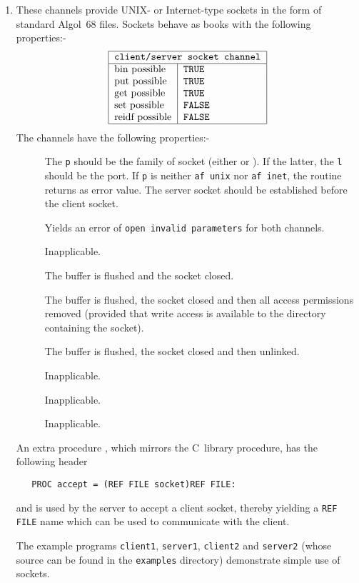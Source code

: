\begin{enumerate}
\item {}\newline
{}\newline
These channels provide UNIX- or Internet-type sockets in the form
of standard Algol~68 files.
Sockets behave as books with the following properties:-
$$\begin{tabular}{|l|l|}\hline
  \multicolumn{2}{|c|}{\texttt{client/server socket channel}}\\ \hline
  bin possible & \texttt{TRUE}\\
  put possible & \texttt{TRUE}\\
  get possible & \texttt{TRUE}\\
  set possible & \texttt{FALSE}\\
  reidf possible & \texttt{FALSE}\\ \hline
  \end{tabular}
$$
The channels have the following properties:-
\begin{description}
\item[] The \verb|p| should be the family of socket (either
 or ). If the latter, the \verb|l| should
be the port. If \verb|p| is neither \verb|af unix| nor \verb|af inet|,
the routine returns  as error value. The
server socket should be established before the client socket.
\item[] Yields an error of \verb|open invalid parameters| for
both channels.
\item[] Inapplicable.
\item[] The buffer is flushed and the socket closed.
\item[]  The buffer is flushed, the socket closed and then all
access permissions removed (provided that write access is available to
the directory containing the socket).
\item[] The buffer is flushed, the socket closed and then
unlinked.
\item[] Inapplicable.
\item[] Inapplicable.
\item[] Inapplicable.
\end{description}
An extra procedure , which mirrors the C~library procedure,
has the following header
\begin{verbatim}
   PROC accept = (REF FILE socket)REF FILE:
\end{verbatim}
\noindent
and is used by the server to accept a client socket, thereby yielding a
\verb|REF FILE| name which can be used to communicate with the client.

The example programs \verb|client1|, \verb|server1|, \verb|client2|
and \verb|server2| (whose source can be found in the \verb|examples|
directory) demonstrate simple use of sockets.
\end{enumerate}

